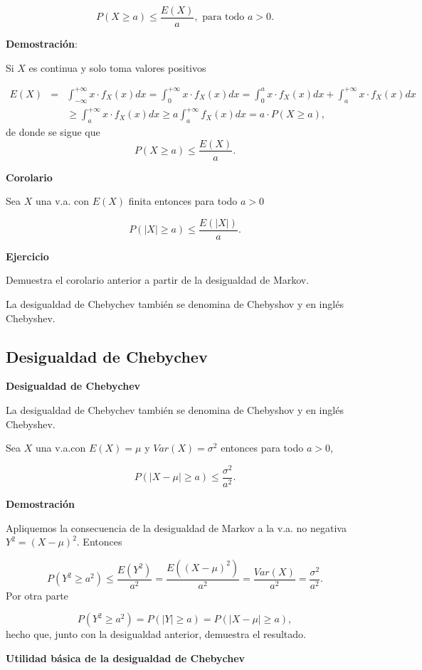 \documentclass[]{book}
\begin{document}
\[P(X\geq a)\leq \frac{E(X)}{a},\mbox{ para todo }a>0.\]

\textbf{Demostración}:

Si \(X\) es continua y solo toma valores positivos

\begin{eqnarray*}
E(X) &=& \int_{-\infty}^{+\infty} x\cdot  f_{X}(x) dx=  \int_0^{+\infty} x\cdot f_{X}(x) dx=  \int_0^{a} x\cdot  f_{X}(x) dx +\int_{a}^{+\infty} x\cdot f_{X}(x) dx \\
& &\geq   \int_{a}^{+\infty} x\cdot
f_{X}(x) dx \geq a \int_{a}^{+\infty}
f_{X}(x) dx = a \cdot  P(X\geq a),
\end{eqnarray*}
de donde se sigue que
\[P(X\geq a)\leq \frac{E(X)}{a}.\]

\textbf{Corolario}

Sea \(X\) una v.a. con \(E(X)\) finita entonces para todo \(a>0\)

\[P(|X|\geq a )\leq \frac{E(|X|)}{a}.\]

\textbf{Ejercicio}

Demuestra el corolario anterior a partir de la desigualdad de Markov.

La desigualdad de Chebychev también se denomina de Chebyshov y en inglés Chebyshev.

\hypertarget{desigualdad-de-chebychev}{%
\subsection{Desigualdad de Chebychev}\label{desigualdad-de-chebychev}}

\textbf{Desigualdad de Chebychev}

La desigualdad de Chebychev también se denomina de Chebyshov y en inglés Chebyshev.

Sea \(X\) una v.a.con \(E(X)=\mu\) y \(Var(X)=\sigma^2\) entonces para todo \(a>0\),

\[P(|X-\mu|\geq a)\leq \frac{\sigma^2}{a^2}.\]

\textbf{Demostración}

Apliquemos la consecuencia de la desigualdad de Markov a la v.a.
no negativa \(Y^2=(X-\mu)^2\). Entonces

\[
P(Y^2\geq a^2) \leq 
\frac{E(Y^2)}{a^2}=\frac{E((X-\mu)^2)}{a^2}
= \frac{Var(X)}{a^2}=\frac{\sigma^2}{a^2}.
\]
Por otra parte

\[
P(Y^2\geq a^2)=P(|Y|\geq a)= P(|X-\mu|\geq a),
\]
hecho que, junto con la desigualdad anterior, demuestra el resultado.

\textbf{Utilidad básica de la desigualdad de Chebychev}
\end{document}
